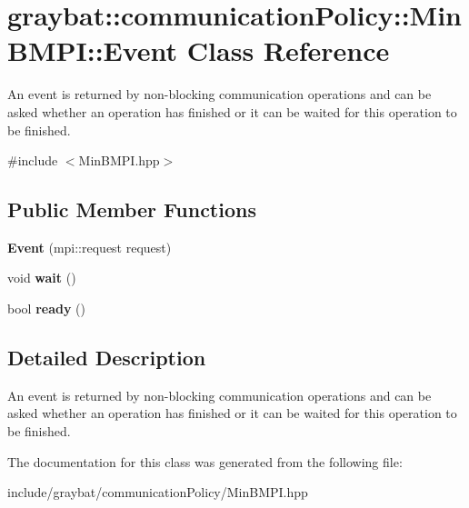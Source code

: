 \hypertarget{classgraybat_1_1communicationPolicy_1_1MinBMPI_1_1Event}{}\section{graybat\+:\+:communication\+Policy\+:\+:Min\+B\+M\+P\+I\+:\+:Event Class Reference}
\label{classgraybat_1_1communicationPolicy_1_1MinBMPI_1_1Event}


An event is returned by non-\/blocking communication operations and can be asked whether an operation has finished or it can be waited for this operation to be finished.  




{\ttfamily \#include $<$Min\+B\+M\+P\+I.\+hpp$>$}

\subsection*{Public Member Functions}
\begin{DoxyCompactItemize}
\item 
\hypertarget{classgraybat_1_1communicationPolicy_1_1MinBMPI_1_1Event_aa8cd6ac49bcde90305e9e7733a20ddac}{}{\bfseries Event} (mpi\+::request request)\label{classgraybat_1_1communicationPolicy_1_1MinBMPI_1_1Event_aa8cd6ac49bcde90305e9e7733a20ddac}

\item 
\hypertarget{classgraybat_1_1communicationPolicy_1_1MinBMPI_1_1Event_a920f03720f6ce9fba4c2e317f5d06ccf}{}void {\bfseries wait} ()\label{classgraybat_1_1communicationPolicy_1_1MinBMPI_1_1Event_a920f03720f6ce9fba4c2e317f5d06ccf}

\item 
\hypertarget{classgraybat_1_1communicationPolicy_1_1MinBMPI_1_1Event_a627a8aa3918cb9b985f8536302184d72}{}bool {\bfseries ready} ()\label{classgraybat_1_1communicationPolicy_1_1MinBMPI_1_1Event_a627a8aa3918cb9b985f8536302184d72}

\end{DoxyCompactItemize}


\subsection{Detailed Description}
An event is returned by non-\/blocking communication operations and can be asked whether an operation has finished or it can be waited for this operation to be finished. 

The documentation for this class was generated from the following file\+:\begin{DoxyCompactItemize}
\item 
include/graybat/communication\+Policy/Min\+B\+M\+P\+I.\+hpp\end{DoxyCompactItemize}
